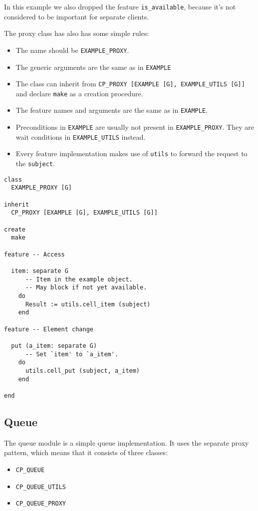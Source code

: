 \documentclass[a4paper,10pt]{report}
\begin{document}
In this example we also dropped the feature \lstinline!is_available!, because it's not considered to be important for separate clients.

The proxy class has also has some simple rules:

 \begin{itemize}
  \item The name should be \lstinline!EXAMPLE_PROXY!.
  \item The generic arguments are the same as in \lstinline!EXAMPLE!
  \item The class can inherit from \lstinline!CP_PROXY [EXAMPLE [G], EXAMPLE_UTILS [G]]! and declare \lstinline!make! as a creation procedure.
  \item The feature names and arguments are the same as in \lstinline!EXAMPLE!.
  \item Preconditions in \lstinline!EXAMPLE! are usually not present in \lstinline!EXAMPLE_PROXY!. They are wait conditions in \lstinline!EXAMPLE_UTILS! instead.
  \item Every feature implementation makes use of \lstinline!utils! to forward the request to the \lstinline!subject!.
 \end{itemize}

\begin{lstlisting}
class
  EXAMPLE_PROXY [G]

inherit
  CP_PROXY [EXAMPLE [G], EXAMPLE_UTILS [G]]

create
  make
  
feature -- Access

  item: separate G
      -- Item in the example object.
      -- May block if not yet available.
    do
      Result := utils.cell_item (subject)
    end

feature -- Element change

  put (a_item: separate G)
      -- Set `item' to `a_item'.
    do
      utils.cell_put (subject, a_item)
    end

end
\end{lstlisting}
 
\subsection{Queue}

The queue module is a simple queue implementation.
It uses the separate proxy pattern, which means that it consists of three classes:

\begin{itemize}
 \item \lstinline!CP_QUEUE!
 \item \lstinline!CP_QUEUE_UTILS!
 \item \lstinline!CP_QUEUE_PROXY!
\end{itemize}
\end{document}
